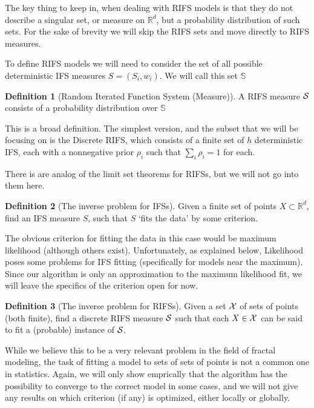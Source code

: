 \documentclass[10pt,a4paper,oneside]{article}
\theoremstyle{definition}
\newtheorem*{dfn}{Definition}
\begin{document}
The key thing to keep in, when dealing with RIFS models is that they do not describe a singular set, or measure on ${\mathbb R}^d$, but a probability distribution of such sets. For the sake of brevity we will skip the RIFS sets and move directly to RIFS measures. 

To define RIFS models we will need to consider the set of all possible deterministic IFS measures $S = {(S_i, w_i)}$. We will call this set ${\mathbb S}$

\begin{dfn}[Random Iterated Function System (Measure)]
A RIFS measure ${\cal S}$consists of a probability distribution over ${\mathbb S}$
\end{dfn}

This is a broad definition. The simplest version, and the subset that we will be focusing on is the Discrete RIFS, which consists of a finite set of $h$ deterministic IFS, each with a nonnegative prior $\rho_i$ such that $\sum_i \rho_i = 1$ for each.

There is are analog of the limit set theorems for RIFSs, but we will not go into them here. 

\begin{dfn}[The inverse problem for IFSs]
Given a finite set of points $X \subset {\mathbb R}^d$, find an IFS measure $S$, such that $S$ `fits the data' by some criterion. 
\end{dfn}

The obvious criterion for fitting the data in this case would be maximum likelihood (although others exist). Unfortunately, as explained below, Likelihood poses some problems for IFS fitting (specifically for models near the maximum). Since our algorithm is only an approximation to the maximum likelihood fit, we will leave the specifics of the criterion open for now.

\begin{dfn}[The inverse problem for RIFSs]
Given a set ${\cal X}$ of sets of points (both finite), find a discrete RIFS measure ${\cal S}$ such that each $X \in {\cal X}$ can be said to fit a (probable) instance of ${\cal S}$.
\end{dfn}

While we believe this to be a very relevant problem in the field of fractal modeling, the task of fitting a model to sets of sets of points is not a common one in statistics. Again, we will only show emprically that the algorithm has the possibility to converge to the correct model in some cases, and we will not give any results on which criterion (if any) is optimized, either locally or globally.
\end{document}
